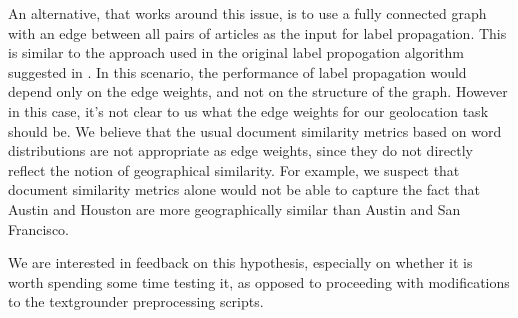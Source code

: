 An alternative, that works around this issue, is to use a fully connected graph with an edge between all pairs of articles as the input for label propagation. This is similar to the approach used in the original label propogation algorithm suggested in \cite{zhu2002learning}.
In this scenario, the performance of label propagation would depend only on the edge weights, and not on the structure of the graph.
However in this case, it's not clear to us what the edge weights for our geolocation task should be.
We believe that the usual document similarity metrics based on word
distributions are not appropriate as edge weights, since they do not directly
reflect the notion of geographical similarity.
For example, we suspect that document similarity metrics alone would not be
able to capture the fact that Austin and Houston are more geographically
similar than Austin and San Francisco.
\par
We are interested in feedback on this hypothesis, especially on whether it is worth spending some time testing it, as opposed to proceeding with modifications to the textgrounder preprocessing scripts.
